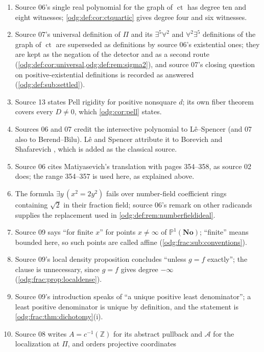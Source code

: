 \documentclass[11pt,oneside]{article}
\numberwithin{equation}{section}
\theoremstyle{definition}
\theoremstyle{remark}
\newcommand{\No}{\mathbf{No}}
\newcommand{\Z}{\mathbb Z}
\newcommand{\ct}{\operatorname{ct}}
\begin{document}
\begin{enumerate}[leftmargin=*]
printed as a remark with that comparison (\cref{odg:def:rem:quintic}), and
source 06's question on the least degree is recorded as answered in part
(\cref{odg:def:sub:settled}).
\item Source 06's single real polynomial for the graph of $\ct$ has degree ten
and eight witnesses; \cref{odg:def:cor:ctquartic} gives degree four and six
witnesses.
\item Source 07's universal definition of $\Pi$ and its $\exists^5\forall^2$
and $\forall^2\exists^5$ definitions of the graph of $\ct$ are superseded as
definitions by source 06's existential ones; they are kept as the negation of
the detector and as a second route (\cref{odg:def:cor:universal,odg:def:rem:sigma2}),
and source 07's closing question on positive-existential definitions is
recorded as answered (\cref{odg:def:sub:settled}).
\item Source 13 states Pell rigidity for positive nonsquare $d$; its own fiber
theorem covers every $D\ne0$, which \cref{odg:cor:pell} states.
\item Sources 06 and 07 credit the intersective polynomial to L\^e--Spencer
(and 07 also to Berend--Bilu). L\^e and Spencer attribute it to Borevich and
Shafarevich \cite[p.~3]{BorevichShafarevich}, which is added as the classical
source.
\item Source 06 cites Matiyasevich's translation with pages 354--358, as source
02 does; the range 354--357 is used here, as explained above.
\item The formula $\exists y\,(x^2=2y^2)$ fails over number-field coefficient
rings containing $\sqrt2$ in their fraction field; source 06's remark on other
radicands supplies the replacement used in \cref{odg:def:rem:numberfieldideal}.
\item Source 09 says ``for finite $x$'' for points $x\ne\infty$ of
$\mathbb P^1(\No)$; ``finite'' means bounded here, so such points are called
affine (\cref{odg:frac:sub:conventions}).
\item Source 09's local density proposition concludes ``unless $g=f$
exactly''; the clause is unnecessary, since $g=f$ gives degree $-\infty$
(\cref{odg:frac:prop:localdense}).
\item Source 09's introduction speaks of ``a unique positive least
denominator''; a least positive denominator is unique by definition, and the
statement is \cref{odg:frac:thm:dichotomy}(i).
\item Source 08 writes $A=c^{-1}(\Z)$ for its abstract pullback and
$\mathcal A$ for the localization at $\Pi$, and orders projective coordinates

\end{enumerate}
\end{document}
